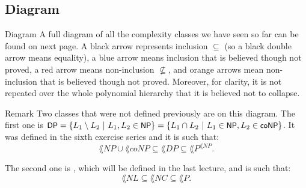 \documentclass[a4paper]{article}
\begin{document}
\subsection{Diagram}

\begin{parag}{Diagram}
    A full diagram of all the complexity classes we have seen so far can be found on next page. A black arrow represents inclusion $\subseteq$ (so a black double arrow means equality), a blue arrow means inclusion that is believed though not proved, a red arrow means non-inclusion $\not\subseteq$, and orange arrows mean non-inclusion that is believed though not proved. Moreover, for clarity, it is not repeated over the whole polynomial hierarchy that it is believed not to collapse.

    \begin{subparag}{Remark}
        Two classes that were not defined previously are on this diagram. The first one is $\lang{DP} = \left\{L_1 \setminus L_2 \suchthat L_1, L_2 \in \lang{NP}\right\} = \left\{L_1 \cap L_2 \suchthat L_1 \in \lang{NP}, L_2 \in \lang{coNP}\right\}$. It was defined in the sixth exercise series and it is such that: 
        \[\lang{NP} \cup \lang{coNP} \subseteq \lang{DP} \subseteq \lang{P}^{\lang{NP}}.\]

        The second one is , which will be defined in the last lecture, and is such that: 
        \[\lang{NL} \subseteq \lang{NC} \subseteq \lang{P}.\]
        
        
    \end{subparag}
\end{parag}

\clearpage
\begin{center}
    \scalebox{0.90}{
        
    }
\end{center}
\clearpage
\end{document}
